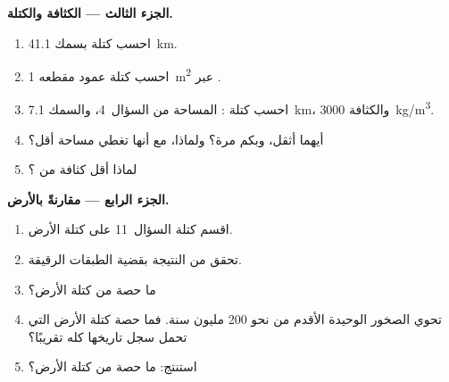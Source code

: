 \begin{problem}
\medskip
\noindent\textbf{الجزء الثالث --- الكثافة والكتلة.}
\begin{enumerate}[resume]
  \item احسب كتلة  بسمك \qty{41.1}{km}.
  \item احسب كتلة عمود مقطعه \qty{1}{m^2} عبر .
  \item احسب كتلة : المساحة من السؤال~4،
        والسمك \qty{7.1}{km}، والكثافة \qty{3000}{kg/m^3}.
  \item أيهما أثقل، وبكم مرة؟ ولماذا، مع أنها تغطي مساحة
        أقل؟
  \item لماذا  أقل كثافة من ؟
\end{enumerate}

\medskip
\noindent\textbf{الجزء الرابع --- مقارنةً بالأرض.}
\begin{enumerate}[resume]
  \item اقسم كتلة السؤال~11 على كتلة الأرض.
  \item تحقق من النتيجة بقضية الطبقات الرقيقة.
  \item ما حصة  من كتلة الأرض؟
  \item تحوي  الصخور الوحيدة الأقدم من نحو 200
        مليون سنة. فما حصة كتلة الأرض التي تحمل سجل
        تاريخها كله تقريبًا؟
  \item استنتج: ما حصة  من كتلة الأرض؟
\end{enumerate}
\end{problem}
